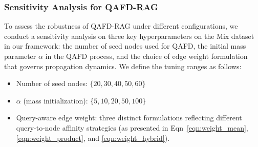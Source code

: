 \documentclass{article} %
\begin{document}



\subsubsection{Sensitivity Analysis for QAFD-RAG}



To assess the robustness of QAFD-RAG under different configurations, we conduct a sensitivity analysis on three key hyperparameters on the Mix dataset in our framework: the number of seed nodes used for QAFD, the initial mass parameter $\alpha$ in the QAFD process, and the choice of edge weight formulation that governs propagation dynamics. We define the tuning ranges as follows:

\begin{itemize}[nosep]
    \item[-] Number of seed nodes: $\{20, 30, 40, 50, 60\}$
    \item[-] $\alpha$ (mass initialization): $\{5, 10, 20, 50, 100\}$
    \item[-] Query-aware edge weight: three distinct formulations reflecting different query-to-node affinity strategies (as presented in Eqn~\eqref{eqn:weight_mean}, \eqref{eqn:weight_product}, and \eqref{eqn:weight_hybrid}).
\end{itemize}
\end{document}
